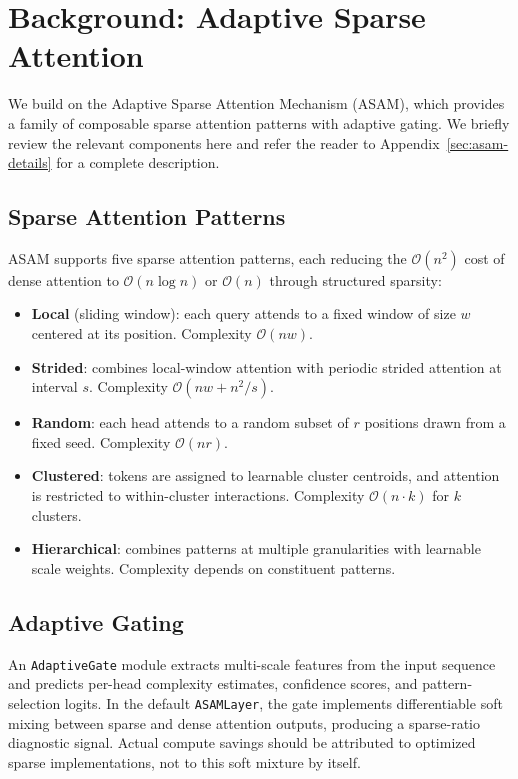 \documentclass[11pt,a4paper]{article}
\theoremstyle{definition}
\begin{document}
\section{Background: Adaptive Sparse Attention}
\label{sec:background}

We build on the Adaptive Sparse Attention Mechanism (ASAM), which provides a family of composable sparse attention patterns with adaptive gating. We briefly review the relevant components here and refer the reader to Appendix~\ref{sec:asam-details} for a complete description.

\subsection{Sparse Attention Patterns}

ASAM supports five sparse attention patterns, each reducing the $\mathcal{O}(n^2)$ cost of dense attention to $\mathcal{O}(n \log n)$ or $\mathcal{O}(n)$ through structured sparsity:

\begin{itemize}
    \item \textbf{Local} (sliding window): each query attends to a fixed window of size $w$ centered at its position. Complexity $\mathcal{O}(n w)$.
    \item \textbf{Strided}: combines local-window attention with periodic strided attention at interval $s$. Complexity $\mathcal{O}(n w + n^2/s)$.
    \item \textbf{Random}: each head attends to a random subset of $r$ positions drawn from a fixed seed. Complexity $\mathcal{O}(n r)$.
    \item \textbf{Clustered}: tokens are assigned to learnable cluster centroids, and attention is restricted to within-cluster interactions. Complexity $\mathcal{O}(n \cdot k)$ for $k$ clusters.
    \item \textbf{Hierarchical}: combines patterns at multiple granularities with learnable scale weights. Complexity depends on constituent patterns.
\end{itemize}

\subsection{Adaptive Gating}

An \texttt{AdaptiveGate} module extracts multi-scale features from the input sequence and predicts per-head complexity estimates, confidence scores, and pattern-selection logits. In the default \texttt{ASAMLayer}, the gate implements differentiable soft mixing between sparse and dense attention outputs, producing a sparse-ratio diagnostic signal. Actual compute savings should be attributed to optimized sparse implementations, not to this soft mixture by itself.
\end{document}
